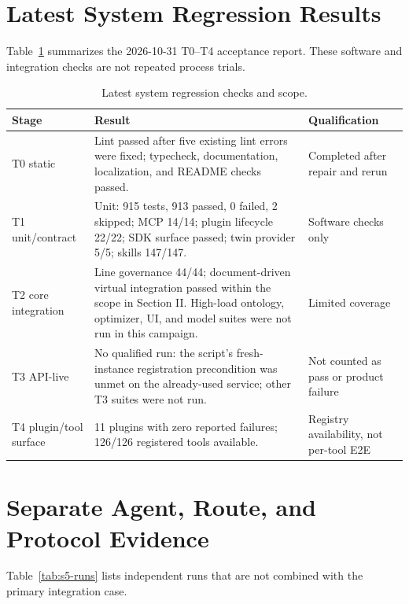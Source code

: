 \documentclass[journal]{IEEEtran}
\begin{document}
\section{Latest System Regression Results}
Table~\ref{tab:s5-tests} summarizes the 2026-10-31 T0--T4 acceptance report.
These software and integration checks are not repeated process trials.

\begin{table}[!t]
\centering
\caption{Latest system regression checks and scope.}
\label{tab:s5-tests}
\footnotesize
\setlength{\tabcolsep}{4pt}
\begin{tabularx}{\textwidth}{@{}p{1.5cm}X p{2.2cm}@{}}
\toprule
Stage & Result & Qualification \\
\midrule
T0 static & Lint passed after five existing lint errors were fixed; typecheck, documentation, localization, and README checks passed. & Completed after repair and rerun \\
T1 unit/contract & Unit: 915 tests, 913 passed, 0 failed, 2 skipped; MCP 14/14; plugin lifecycle 22/22; SDK surface passed; twin provider 5/5; skills 147/147. & Software checks only \\
T2 core integration & Line governance 44/44; document-driven virtual integration passed within the scope in Section II. High-load ontology, optimizer, UI, and model suites were not run in this campaign. & Limited coverage \\
T3 API-live & No qualified run: the script's fresh-instance registration precondition was unmet on the already-used service; other T3 suites were not run. & Not counted as pass or product failure \\
T4 plugin/tool surface & 11 plugins with zero reported failures; 126/126 registered tools available. & Registry availability, not per-tool E2E \\
\bottomrule
\end{tabularx}
\end{table}

\section{Separate Agent, Route, and Protocol Evidence}
Table~\ref{tab:s5-runs} lists independent runs that are not combined with the
primary integration case.
\end{document}
